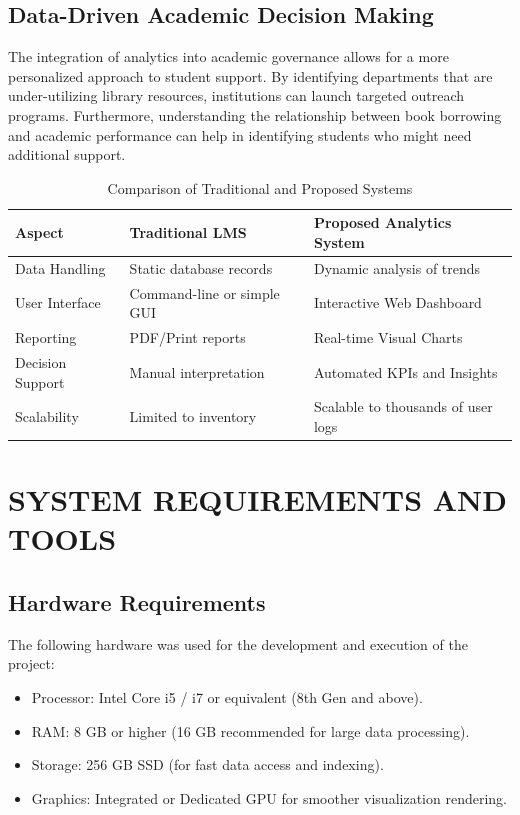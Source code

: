 \documentclass[12pt,a4paper]{report}
\begin{document}
\section{Data-Driven Academic Decision Making}
The integration of analytics into academic governance allows for a more personalized approach to student support. By identifying departments that are under-utilizing library resources, institutions can launch targeted outreach programs. Furthermore, understanding the relationship between book borrowing and academic performance can help in identifying students who might need additional support.

\begin{table}[H]
\centering
\begin{tabular}{@{}lll@{}}
\toprule
\textbf{Aspect} & \textbf{Traditional LMS} & \textbf{Proposed Analytics System} \\ \midrule
Data Handling & Static database records & Dynamic analysis of trends \\
User Interface & Command-line or simple GUI & Interactive Web Dashboard \\
Reporting & PDF/Print reports & Real-time Visual Charts \\
Decision Support & Manual interpretation & Automated KPIs and Insights \\
Scalability & Limited to inventory & Scalable to thousands of user logs \\ \bottomrule
\end{tabular}
\caption{Comparison of Traditional and Proposed Systems}
\end{table}

\chapter{SYSTEM REQUIREMENTS AND TOOLS}
\section{Hardware Requirements}
The following hardware was used for the development and execution of the project:
\begin{itemize}
    \item Processor: Intel Core i5 / i7 or equivalent (8th Gen and above).
    \item RAM: 8 GB or higher (16 GB recommended for large data processing).
    \item Storage: 256 GB SSD (for fast data access and indexing).
    \item Graphics: Integrated or Dedicated GPU for smoother visualization rendering.
\end{itemize}
\end{document}
